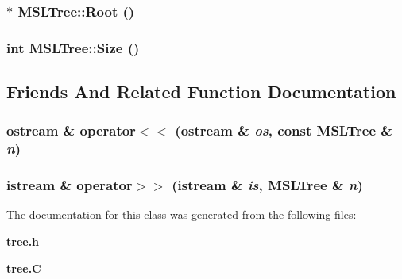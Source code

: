 \subsubsection{ $\ast$ MSLTree::Root ()\hspace{0.3cm}{\tt  [inline]}}\label{classMSLTree_a11}


\subsubsection{\setlength{\rightskip}{0pt plus 5cm}int MSLTree::Size ()\hspace{0.3cm}{\tt  [inline]}}\label{classMSLTree_a12}




\subsection{Friends And Related Function Documentation}
\subsubsection{\setlength{\rightskip}{0pt plus 5cm}ostream \& operator$<$$<$ (ostream \& {\em os}, const MSLTree \& {\em n})\hspace{0.3cm}{\tt  [friend]}}\label{classMSLTree_l1}


\subsubsection{\setlength{\rightskip}{0pt plus 5cm}istream \& operator$>$$>$ (istream \& {\em is}, MSLTree \& {\em n})\hspace{0.3cm}{\tt  [friend]}}\label{classMSLTree_l0}




The documentation for this class was generated from the following files:\begin{CompactItemize}
\item 
{\bf tree.h}\item 
{\bf tree.C}\end{CompactItemize}
